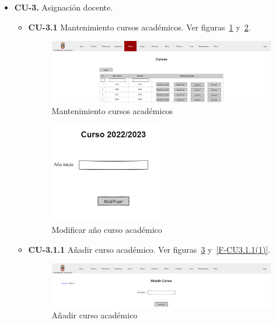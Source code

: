 \begin{itemize}
\newpage
	\item \textbf{CU-3.} Asignación docente.
	\begin{itemize}
		\item \textbf{CU-3.1} Mantenimiento cursos académicos. Ver figuras~\ref{F-CU3.1} y~\ref{F-CU3.1(1)}.
		\begin{figure}[!h]
		\centering
		\includegraphics[width=\textwidth]{../img/Anexos/Vistas/cursos.png}
		\caption{Mantenimiento cursos académicos}\label{F-CU3.1}
		\end{figure}
		\FloatBarrier
		\begin{figure}[!h]
		\centering
		\includegraphics[width=0.5\textwidth]{../img/Anexos/Vistas/mod_ano_curso.png}
		\caption{Modificar año curso académico}\label{F-CU3.1(1)}
		\end{figure}
		\FloatBarrier
\newpage
		\item \textbf{CU-3.1.1} Añadir curso académico. Ver figuras~\ref{F-CU3.1.1} y~\ref{F-CU3.1.1(1)}.
		\begin{figure}[!h]
		\centering
		\includegraphics[width=\textwidth]{../img/Anexos/Vistas/add_curso.png}
		\caption{Añadir curso académico}\label{F-CU3.1.1}
		\end{figure}
		\FloatBarrier
		\begin{figure}[!h]

\end{figure}
\end{itemize}
\end{itemize}
